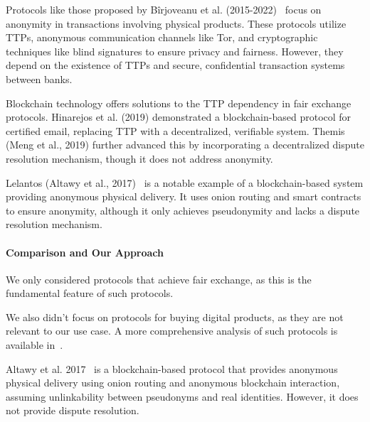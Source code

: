 \documentclass[pdftex,twocolumn,epjc3]{svjour3}
\begin{document}
\begin{sloppypar}
Protocols like those proposed by Bîrjoveanu et al. (2015-2022)~\cite{birjoveanuAnonymityFairexchangeEcommerce2015, birjoveanuPreservingAnonymityFair2018, birjoveanuAnonymityComplexTransactions2019, birjoveanuFairExchangeECommerce2020, birjoveanuTwoPartyECommerceProtocols2022} focus on anonymity in transactions involving physical products. These protocols utilize TTPs, anonymous communication channels like Tor, and cryptographic techniques like blind signatures to ensure privacy and fairness. However, they depend on the existence of TTPs and secure, confidential transaction systems between banks.

Blockchain technology offers solutions to the TTP dependency in fair exchange protocols. Hinarejos et al. (2019)\cite{hinarejosSolutionSecureCertified2019} demonstrated a blockchain-based protocol for certified email, replacing TTP with a decentralized, verifiable system. Themis (Meng et al., 2019)\cite{mengThemisDecentralizedEscrow2019} further advanced this by incorporating a decentralized dispute resolution mechanism, though it does not address anonymity.
\end{sloppypar}

Lelantos (Altawy et al., 2017)~\cite{altawyLelantosBlockchainBasedAnonymous2017} is a notable example of a blockchain-based system providing anonymous physical delivery. It uses onion routing and smart contracts to ensure anonymity, although it only achieves pseudonymity and lacks a dispute resolution mechanism.

\paragraph{Comparison and Our Approach}

We only considered protocols that achieve fair exchange, as this is the fundamental feature of such protocols.

\begin{sloppypar}
We also didn't focus on protocols for buying digital products, as they are not relevant to our use case. A more comprehensive analysis of such protocols is available in~\cite{birjoveanuTwoPartyECommerceProtocols2022}.
\end{sloppypar}

Altawy et al. 2017~\cite{altawyLelantosBlockchainBasedAnonymous2017} is a blockchain-based protocol that provides anonymous physical delivery using onion routing and anonymous blockchain interaction, assuming unlinkability between pseudonyms and real identities. However, it does not provide dispute resolution.
\end{document}
